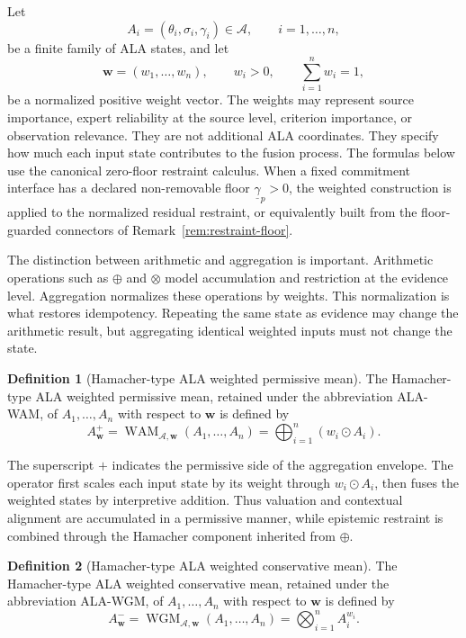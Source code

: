\documentclass[reqno,final]{amsart}
\theoremstyle{definition}
\newtheorem{definition}{Definition}
\theoremstyle{plain}
\theoremstyle{remark}
\providecommand{\cA}{\mathcal{A}}
\begin{document}
Let
\[
A_i=(\theta_i,\sigma_i,\gamma_i)\in\cA,\qquad i=1,\ldots,n,
\]
be a finite family of ALA states, and let
\begin{equation}
\mathbf{w}=(w_1,\ldots,w_n),
\qquad
w_i>0,
\qquad
\sum_{i=1}^{n}w_i=1,
\label{eq:weight-vector}
\end{equation}
be a normalized positive weight vector. The weights may represent source importance, expert reliability at the source level, criterion importance, or observation relevance. They are not additional ALA coordinates. They specify how much each input state contributes to the fusion process. The formulas below use the canonical zero-floor restraint calculus. When a fixed commitment interface has a declared non-removable floor \(\underline{\gamma}_p>0\), the weighted construction is applied to the normalized residual restraint, or equivalently built from the floor-guarded connectors of Remark~\ref{rem:restraint-floor}.

The distinction between arithmetic and aggregation is important. Arithmetic operations such as \(\oplus\) and \(\otimes\) model accumulation and restriction at the evidence level. Aggregation normalizes these operations by weights. This normalization is what restores idempotency. Repeating the same state as evidence may change the arithmetic result, but aggregating identical weighted inputs must not change the state.

\begin{definition}[Hamacher-type ALA weighted permissive mean]
\label{def:ala-wam}
The Hamacher-type ALA weighted permissive mean, retained under the abbreviation ALA-WAM, of \(A_1,\ldots,A_n\) with respect to \(\mathbf{w}\) is defined by
\[
A_{\mathbf{w}}^{+}
=
\operatorname{WAM}_{\cA,\mathbf{w}}(A_1,\ldots,A_n)
=
\bigoplus_{i=1}^{n}(w_i\odot A_i).
\]
\end{definition}

The superscript \(+\) indicates the permissive side of the aggregation envelope. The operator first scales each input state by its weight through \(w_i\odot A_i\), then fuses the weighted states by interpretive addition. Thus valuation and contextual alignment are accumulated in a permissive manner, while epistemic restraint is combined through the Hamacher component inherited from \(\oplus\).

\begin{definition}[Hamacher-type ALA weighted conservative mean]
\label{def:ala-wgm}
The Hamacher-type ALA weighted conservative mean, retained under the abbreviation ALA-WGM, of \(A_1,\ldots,A_n\) with respect to \(\mathbf{w}\) is defined by
\[
A_{\mathbf{w}}^{-}
=
\operatorname{WGM}_{\cA,\mathbf{w}}(A_1,\ldots,A_n)
=
\bigotimes_{i=1}^{n} A_i^{w_i}.
\]
\end{definition}
\end{document}
